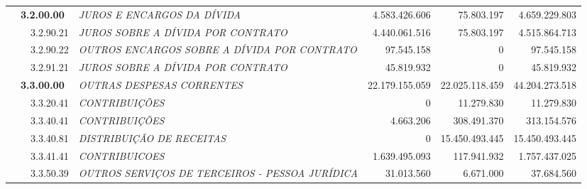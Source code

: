\documentclass{article}
\begin{document}
\begin{longtable}[c]{m{0.1cm}m{0.1cm}m{0.8cm}|m{8cm}|m{2cm}|m{2cm}|m{2cm}}
\multicolumn{1}{l}{} & \multicolumn{2}{l|}{\textbf{3.2.00.00}} & \multicolumn{1}{L{8cm}|}{\textit{JUROS E ENCARGOS DA DÍVIDA}} & \multicolumn{1}{r|}{4.583.426.606} & \multicolumn{1}{r|}{75.803.197} &  \multicolumn{1}{r}{4.659.229.803}\\
\multicolumn{1}{l}{} & \multicolumn{1}{l}{} & \multicolumn{1}{l|}{3.2.90.21} & \multicolumn{1}{L{8cm}|}{\textit{JUROS SOBRE A DÍVIDA POR CONTRATO}} & \multicolumn{1}{r|}{4.440.061.516} & \multicolumn{1}{r|}{75.803.197} &  \multicolumn{1}{r}{4.515.864.713}\\
\multicolumn{1}{l}{} & \multicolumn{1}{l}{} & \multicolumn{1}{l|}{3.2.90.22} & \multicolumn{1}{L{8cm}|}{\textit{OUTROS ENCARGOS SOBRE A DÍVIDA POR CONTRATO}} & \multicolumn{1}{r|}{97.545.158} & \multicolumn{1}{r|}{             0} &  \multicolumn{1}{r}{97.545.158}\\
\multicolumn{1}{l}{} & \multicolumn{1}{l}{} & \multicolumn{1}{l|}{3.2.91.21} & \multicolumn{1}{L{8cm}|}{\textit{JUROS SOBRE A DÍVIDA POR CONTRATO}} & \multicolumn{1}{r|}{45.819.932} & \multicolumn{1}{r|}{             0} &  \multicolumn{1}{r}{45.819.932}\\
\multicolumn{1}{l}{} & \multicolumn{2}{l|}{\textbf{3.3.00.00}} & \multicolumn{1}{L{8cm}|}{\textit{OUTRAS DESPESAS CORRENTES}} & \multicolumn{1}{r|}{22.179.155.059} & \multicolumn{1}{r|}{22.025.118.459} &  \multicolumn{1}{r}{44.204.273.518}\\
\multicolumn{1}{l}{} & \multicolumn{1}{l}{} & \multicolumn{1}{l|}{3.3.20.41} & \multicolumn{1}{L{8cm}|}{\textit{CONTRIBUIÇÕES}} & \multicolumn{1}{r|}{             0} & \multicolumn{1}{r|}{11.279.830} &  \multicolumn{1}{r}{11.279.830}\\
\multicolumn{1}{l}{} & \multicolumn{1}{l}{} & \multicolumn{1}{l|}{3.3.40.41} & \multicolumn{1}{L{8cm}|}{\textit{CONTRIBUIÇÕES}} & \multicolumn{1}{r|}{4.663.206} & \multicolumn{1}{r|}{308.491.370} &  \multicolumn{1}{r}{313.154.576}\\
\multicolumn{1}{l}{} & \multicolumn{1}{l}{} & \multicolumn{1}{l|}{3.3.40.81} & \multicolumn{1}{L{8cm}|}{\textit{DISTRIBUIÇÃO DE RECEITAS}} & \multicolumn{1}{r|}{             0} & \multicolumn{1}{r|}{15.450.493.445} &  \multicolumn{1}{r}{15.450.493.445}\\
\multicolumn{1}{l}{} & \multicolumn{1}{l}{} & \multicolumn{1}{l|}{3.3.41.41} & \multicolumn{1}{L{8cm}|}{\textit{CONTRIBUICOES}} & \multicolumn{1}{r|}{1.639.495.093} & \multicolumn{1}{r|}{117.941.932} &  \multicolumn{1}{r}{1.757.437.025}\\
\multicolumn{1}{l}{} & \multicolumn{1}{l}{} & \multicolumn{1}{l|}{3.3.50.39} & \multicolumn{1}{L{8cm}|}{\textit{OUTROS SERVIÇOS DE TERCEIROS - PESSOA JURÍDICA}} & \multicolumn{1}{r|}{31.013.560} & \multicolumn{1}{r|}{6.671.000} &  \multicolumn{1}{r}{37.684.560}\\

\end{longtable}
\end{document}
